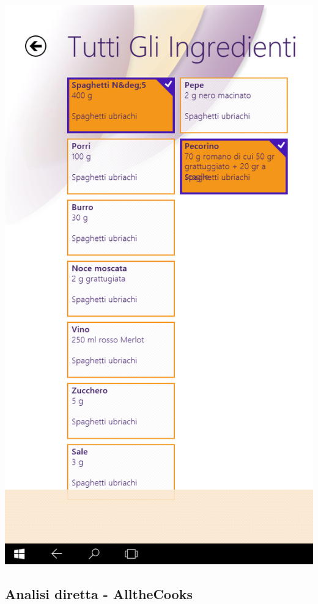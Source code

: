 \begin{itemize}
\begin{center}
\includegraphics[scale=0.27] {img/Giallozafferano/lista_spesa_selezione_1.png}  
\end{center}
\end{itemize}

\subsection*{Analisi diretta - AlltheCooks}


